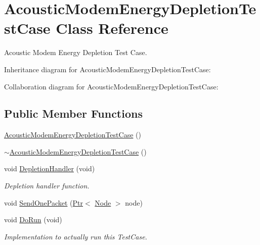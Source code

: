 \hypertarget{classAcousticModemEnergyDepletionTestCase}{}\section{Acoustic\+Modem\+Energy\+Depletion\+Test\+Case Class Reference}
\label{classAcousticModemEnergyDepletionTestCase}


Acoustic Modem Energy Depletion Test Case.  




Inheritance diagram for Acoustic\+Modem\+Energy\+Depletion\+Test\+Case\+:


Collaboration diagram for Acoustic\+Modem\+Energy\+Depletion\+Test\+Case\+:
\subsection*{Public Member Functions}
\begin{DoxyCompactItemize}
\item 
\hyperlink{classAcousticModemEnergyDepletionTestCase_a53634e19f40b436de75acc34bc34b4d4}{Acoustic\+Modem\+Energy\+Depletion\+Test\+Case} ()
\item 
\hyperlink{classAcousticModemEnergyDepletionTestCase_ac72a0d569f99d6ab9e50daf1da0ee516}{$\sim$\+Acoustic\+Modem\+Energy\+Depletion\+Test\+Case} ()
\item 
void \hyperlink{classAcousticModemEnergyDepletionTestCase_a821bfbad5268c94f381b46b3da55c166}{Depletion\+Handler} (void)
\begin{DoxyCompactList}\small\item\em Depletion handler function. \end{DoxyCompactList}\item 
void \hyperlink{classAcousticModemEnergyDepletionTestCase_a3516e25b430f496c6a3ba2366e08691a}{Send\+One\+Packet} (\hyperlink{classns3_1_1Ptr}{Ptr}$<$ \hyperlink{classns3_1_1Node}{Node} $>$ node)
\item 
void \hyperlink{classAcousticModemEnergyDepletionTestCase_a36ddefb587ebfbbcbfe60d0bdbc4de91}{Do\+Run} (void)
\begin{DoxyCompactList}\small\item\em Implementation to actually run this Test\+Case. \end{DoxyCompactList}\end{DoxyCompactItemize}
